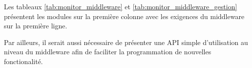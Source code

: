 \begin{table}[h!]
    \centering
    \caption{Utilisation des services de gestion du middleware par les différents modules}
    \label{tab:monitor_middleware_gestion}
\end{table}
Les tableaux \ref{tab:monitor_middleware} et \ref{tab:monitor_middleware_gestion} présentent les modules sur la première colonne avec les exigences du middleware sur la
première ligne.
\newline

Par ailleurs, il serait aussi nécessaire de présenter une API simple d'utilisation au niveau du middleware afin de faciliter la
programmation de nouvelles fonctionalité.
